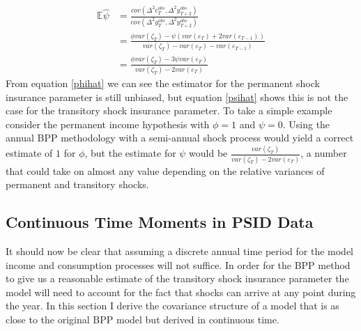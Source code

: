 \documentclass[titlepage]{\econtex}\newcommand{\texname}{BPP_PSID_TimeAgg}
\begin{document}
\begin{align}
\mathbb{E} \hat{\psi} &= \frac{cov(\Delta^2 c^{obs}_T,\Delta^2 y^{obs}_{T+2})}{cov(\Delta^2 y^{obs}_T,\Delta^2 y^{obs}_{T+2})} \nonumber\\
& = \frac{\phi var(\zeta_T) -\psi(var(\varepsilon_T) + 2var(\varepsilon_{T-1}) )}{ var(\zeta_T) - var(\varepsilon_T) -var(\varepsilon_{T-1}) } \nonumber\\
& = \frac{\phi var(\zeta_T) -3\psi var(\varepsilon_T)  }{ var(\zeta_T) - 2var(\varepsilon_T)  }	\label{psihat}
\end{align}
From equation \ref{phihat} we can see the estimator for the permanent shock insurance parameter is still unbiased, but equation \ref{psihat} shows this is not the case for the transitory shock insurance parameter. To take a simple example consider the permanent income hypothesis with $\phi=1$ and $\psi=0$. Using the annual BPP methodology with a semi-annual shock process would yield a correct estimate of $1$ for $\phi$, but the estimate for $\psi$ would be  $\frac{var(\zeta_T)   }{ var(\zeta_T) - 2var(\varepsilon_T)  }$, a number that could take on almost any value depending on the relative variances of permanent and transitory shocks.

\subsection{Continuous Time Moments in PSID Data}
It should now be clear that assuming a discrete annual time period for the model income and consumption processes will not suffice. In order for the BPP method to give us a reasonable estimate of the transitory shock insurance parameter the model will need to account for the fact that shocks can arrive at any point during the year. In this section I derive the covariance structure of a model that is as close to the original BPP model but derived in continuous time.
\end{document}
